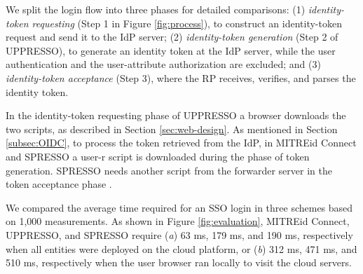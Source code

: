  We split the login flow into three phases for detailed comparisons: (1)
{\em identity-token requesting} (Step 1 in Figure \ref{fig:process}), to construct an identity-token request and send it to the IdP server; (2) {\em identity-token generation} (Step 2 of UPPRESSO), to generate an identity token at the IdP server, while the user authentication and the user-attribute authorization are excluded; and (3) {\em identity-token acceptance} (Step 3), where the RP receives, verifies, and parses the identity token.

In the identity-token requesting phase of UPPRESSO a browser downloads the two scripts,
    as described in Section \ref{sec:web-design}.
As mentioned in Section \ref{subsec:OIDC},
 to process the token retrieved from the IdP, %
    in MITREid Connect and SPRESSO a user-r script is downloaded during the phase of token generation.
SPRESSO needs another script from the forwarder server in the token acceptance phase \cite{SPRESSO}.

We compared the average time required for an SSO login in three schemes based on 1,000 measurements. As shown in Figure \ref{fig:evaluation},
MITREid Connect, UPPRESSO, and SPRESSO require (\emph{a}) 63 ms, 179 ms, and 190 ms, respectively when all entities were deployed on the cloud platform,
 or (\emph{b}) 312 ms, 471 ms, and 510 ms, respectively when the user browser ran locally to visit the cloud servers.

